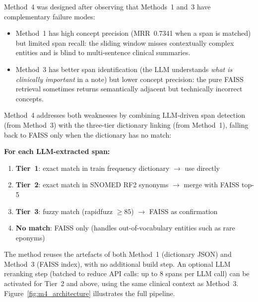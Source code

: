 Method~4 was designed after observing that Methods~1 and~3 have complementary failure modes:

\begin{itemize}
    \item Method~1 has high concept precision (MRR~0.7341 when a span is matched) but limited span recall: the sliding window misses contextually complex entities and is blind to multi-sentence clinical summaries.
    \item Method~3 has better span identification (the LLM understands \textit{what is clinically important} in a note) but lower concept precision: the pure FAISS retrieval sometimes returns semantically adjacent but technically incorrect concepts.
\end{itemize}

Method~4 addresses both weaknesses by combining LLM-driven span detection (from Method~3) with the three-tier dictionary linking (from Method~1), falling back to FAISS only when the dictionary has no match:

\begin{center}
\begin{minipage}{0.85\linewidth}
\textbf{For each LLM-extracted span:}
\begin{enumerate}
    \item \textbf{Tier~1}: exact match in train frequency dictionary $\rightarrow$ use directly
    \item \textbf{Tier~2}: exact match in SNOMED RF2 synonyms $\rightarrow$ merge with FAISS top-5
    \item \textbf{Tier~3}: fuzzy match (rapidfuzz $\geq 85$) $\rightarrow$ FAISS as confirmation
    \item \textbf{No match}: FAISS only (handles out-of-vocabulary entities such as rare eponyms)
\end{enumerate}
\end{minipage}
\end{center}

The method reuses the artefacts of both Method~1 (dictionary JSON) and Method~3 (FAISS index), with no additional build step. An optional LLM reranking step (batched to reduce API calls: up to 8 spans per LLM call) can be activated for Tier~2 and above, using the same clinical context as Method~3. Figure~\ref{fig:m4_architecture} illustrates the full pipeline.

